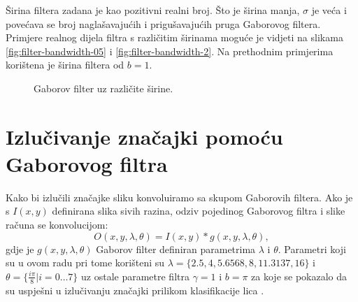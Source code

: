\documentclass{article}
\begin{document}
Širina filtera zadana je kao pozitivni realni broj. Što je širina manja,
$\sigma$ je veća i povećava se broj naglašavajućih i prigušavajućih pruga
Gaborovog filtera.~ Primjere realnog dijela filtra s
različitim širinama moguće je vidjeti na slikama \ref{fig:filter-bandwidth-05}
i \ref{fig:filter-bandwidth-2}. Na prethodnim primjerima korištena je širina
filtera od $b = 1$.

\begin{figure}[h!tb]
\centering
{}
\hspace{50pt}
\caption{Gaborov filter uz različite širine.}
\label{fig:filter-bandwidths}
\end{figure}

\section{Izlučivanje značajki pomoću Gaborovog filtra}

Kako bi izlučili značajke sliku konvoluiramo sa skupom Gaborovih filtera. Ako
je s $I(x, y)$ definirana slika sivih razina, odziv pojedinog Gaborovog filtra i
slike računa se konvolucijom:
\begin{equation}
O(x,y,\lambda, \theta) = I(x,y) * g(x,y,\lambda, \theta),
\label{konvolucija-filter-slika}
\end{equation}
gdje je $g(x,y,\lambda, \theta)$ Gaborov filter definiran parametrima $\lambda$
i $\theta$. Parametri koji su u ovom radu pri tome korišteni su $\lambda =
\{2.5, 4, 5.6568, 8, 11.3137, 16\}$ i $\theta = \{ \frac{i \pi}{8} | i =
0 \ldots 7\}$ uz ostale parametre filtra $\gamma = 1$ i $b = \pi$ za koje se
pokazalo da su uspješni u izlučivanju značajki prilikom klasifikacije lica
\citep{shen2007gabor}.
\end{document}

